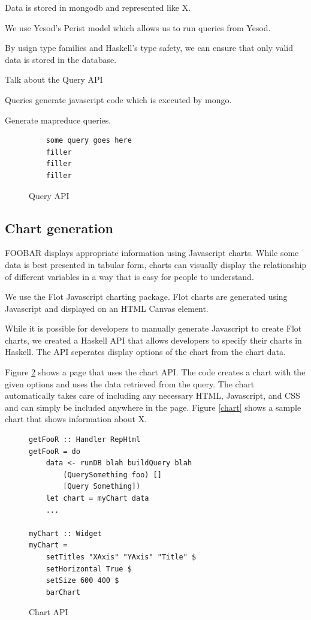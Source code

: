 \documentclass{chi2009}
\begin{document}
Data is stored in mongodb and represented like X.

We use Yesod's Perist model which allows us to run queries from Yesod.

By usign type families and Haskell's type safety, we can ensure that only valid data is stored in the database. 

Talk about the Query API

Queries generate javascript code which is executed by mongo.

Generate mapreduce queries.

\begin{figure}[]
\begin{verbatim}
    some query goes here
    filler
    filler
    filler
\end{verbatim}
    \caption{Query API}
    \label{api}
\end{figure}

\subsection{Chart generation}

FOOBAR displays appropriate information using Javascript charts. While some data is best presented in tabular form, charts can visually display the relationship of different variables in a way that is easy for people to understand.

We use the Flot Javascript charting package. Flot charts are generated using Javascript and displayed on an HTML Canvas element. 

While it is possible for developers to manually generate Javascript to create Flot charts, we created a Haskell API that allows developers to specify their charts in Haskell. The API seperates display options of the chart from the chart data.

Figure \ref{chartcode} shows a page that uses the chart API. The code creates a chart with the given options and uses the data retrieved from the query. The chart automatically takes care of including any necessary HTML, Javascript, and CSS and can simply be included anywhere in the page. Figure \ref{chart} shows a sample chart that shows information about X.

\begin{figure}[]
\begin{verbatim}
getFooR :: Handler RepHtml
getFooR = do
    data <- runDB blah buildQuery blah
        (QuerySomething foo) []
        [Query Something])
    let chart = myChart data
    ...

myChart :: Widget
myChart = 
    setTitles "XAxis" "YAxis" "Title" $
    setHorizontal True $
    setSize 600 400 $
    barChart
\end{verbatim}
    \caption{Chart API}
    \label{chartcode}
\end{figure}
\end{document}
